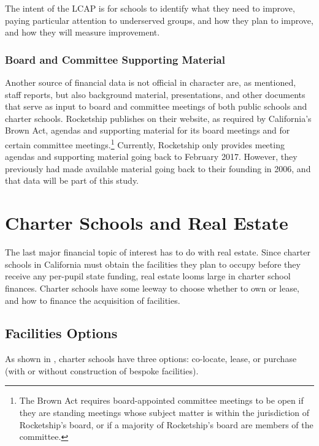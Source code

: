 The intent of the LCAP is for schools to identify what they need to improve, paying particular attention to underserved groups, and how they plan to improve, and how they will measure improvement. 

\subsubsection{Board and Committee Supporting Material}\label{sec:board-committee-packets}\indent

Another source of financial data is not official in character are, as mentioned, staff reports, but also background material, presentations, and other documents that serve as input to board and committee meetings of both public schools and charter schools.  Rocketship publishes on their website, as required by California's Brown Act, agendas and supporting material for its board meetings and for certain committee meetings.\footnote{The Brown Act requires board-appointed committee meetings to be open if they are standing meetings whose subject matter is within the jurisdiction of Rocketship's board, or if a majority of Rocketship's board are members of the committee.} Currently, Rocketship only provides meeting agendas and supporting material going back to February 2017. However, they previously had made available material going back to their founding in 2006, and that data will be part of this study.

\section{Charter Schools and Real Estate}\label{sec:real-estate}\indent

The last major financial topic of interest has to do with real estate. Since charter schools in California must obtain the facilities they plan to occupy before they receive any per-pupil state funding, real estate looms large in charter school finances. Charter schools have some leeway to choose whether to own or lease, and how to finance the acquisition of facilities.

\subsection{Facilities Options}\label{sec:facilities-options}\indent

As shown in , charter schools have three options: co-locate, lease, or purchase (with or without construction of bespoke facilities).

